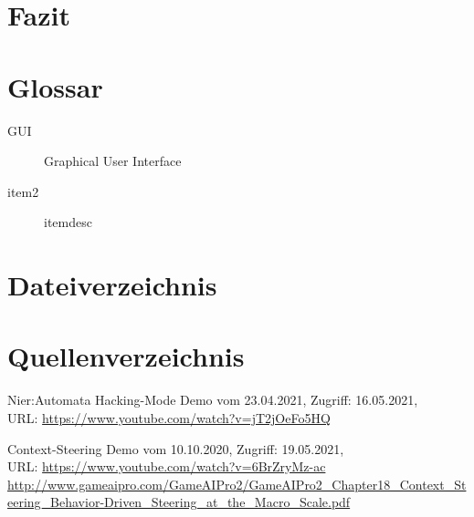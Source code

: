 \documentclass[a4paper,10pt,ngerman,fontsize=12pt]{scrreprt}
\begin{document}
\lipsum[3]





\chapter{Fazit}

\lipsum[3]





\chapter{Glossar}

\begin{description}
\item[GUI] Graphical User Interface
\item[item2] itemdesc
\end{description}




\chapter{Dateiverzeichnis}




\chapter{Quellenverzeichnis}

\begin{thebibliography}{999}

 Nier:Automata Hacking-Mode Demo vom 23.04.2021,  Zugriff:  16.05.2021, \\ URL:
\url{https://www.youtube.com/watch?v=jT2jOeFo5HQ}

 Context-Steering Demo vom 10.10.2020,  Zugriff:  19.05.2021, \\ URL:
\url{https://www.youtube.com/watch?v=6BrZryMz-ac}
\url{http://www.gameaipro.com/GameAIPro2/GameAIPro2_Chapter18_Context_Steering_Behavior-Driven_Steering_at_the_Macro_Scale.pdf}

\end{thebibliography}
    
\end{document}
